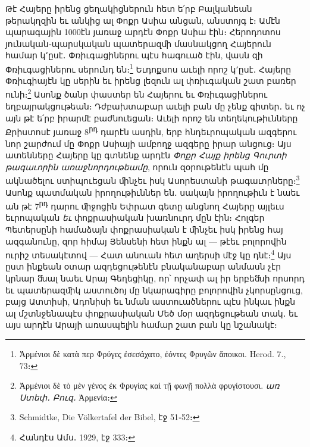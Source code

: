 \documentclass{article}
\begin{document}
{Թէ Հայերը իրենց ցեղակիցներուն հետ ե՛րբ Բալկանեան թերակղզին եւ անկից ալ Փոքր Ասիա անցան, անստոյգ է։ Ամէն պարագային 1000էն յառաջ արդէն Փոքր Ասիա էին։ Հերոդոտոս յունական֊պարսկական պատերազﬕ մասնակցող Հայերուն համար կ՚ըսէ․ Փռիւգացիներու պէս հագուած էին, վասն զի Փռիւգացիներու սերունդ են։\footnote{Ἀρμένιοι δὲ κατὰ περ Φρύγες ἐσεσάχατο, ἐόντες Φρυγῶν ἄποικοι. Herod. 7., 73։} Եւդոքսոս աւելի որոշ կ՚ըսէ․ Հայերը Փռիւգիայէն կը սերին եւ իրենց լեզուն ալ փռիւգական շատ բառեր ունի։\footnote{Ἀρμένιοι δὲ τὸ μὲν γένος ἐκ Φρυγίας καὶ τῇ φωνῇ πολλὰ φρυγίστουσι. \emph{առ Ստեփ․ Բուզ․} Ἀρμενία։} Ասոնք ծանր փաստեր են Հայերու եւ Փռիւգացիներու եղբայրակցութեան։ Դժբախտաբար աւելի բան մը չենք գիտեր․ եւ ոչ այն թէ ե՛րբ իրարմէ բաժնուեցան։ Աւելի որոշ են տեղեկութիւնները Քրիստոսէ յառաջ 8\textsuperscript{րդ} դարէն ասդին, երբ հնդեւրոպական ազգերու նոր շարժում մը Փոքր Ասիայի ամբողջ ազգերը իրար անցուց։ Այս ատենները Հայերը կը գտնենք արդէն \emph{Փոքր Հայք իրենց Գուրտի թագաւորին առաջնորդութեամը}, որուն զօրութենէն պահ մը ակնածելու ստիպուեցան ﬕնչեւ իսկ Ասորեստանի թագաւորները։\footnote{Schmidtke, Die Völkertafel der Bibel, էջ 51֊52։} Ասոնք պատմական իրողութիւններ են․ սակայն իրողութիւն է նաեւ ան թէ 7\textsuperscript{րդ} դարու ﬕջոցին Եփրատ գետը անցնող Հայերը այլեւս եւրոպական \emph{եւ} փոքրասիական խառնուրդ մըն էին։ Հոլգեր Պետերսընի համաձայն փոքրասիական է ﬕնչեւ իսկ իրենց հայ ազգանունը, զոր հիմայ Յենսենի հետ ինքն ալ — թէեւ բոլորովին ուրիշ տեսակէտով — Հատ անուան հետ աղերսի մէջ կը դնէ։\footnote{Հանդէս Ամս․ 1929, էջ 333։} Այս ըստ ինքեան օտար ազդեցութենէն բնականաբար անմասն չէր կրնար ﬓալ նաեւ Արայ Գեղեցիկը, որ՝ որչափ ալ իր երբեﬓի որսորդ եւ պատերազﬕկ աստուծոյ մը նկարագիրը բոլորովին չկորսընցուց, բայց Ատտիսի, Ադոնիսի եւ նման աստուածներու պէս ինկաւ ինքն ալ մշտնջենապէս փոքրասիական Մեծ մօր ազդեցութեան տակ․ եւ այս արդէն Արայի առասպելին համար շատ բան կը նշանակէ։}
\clearpage
\end{document}

